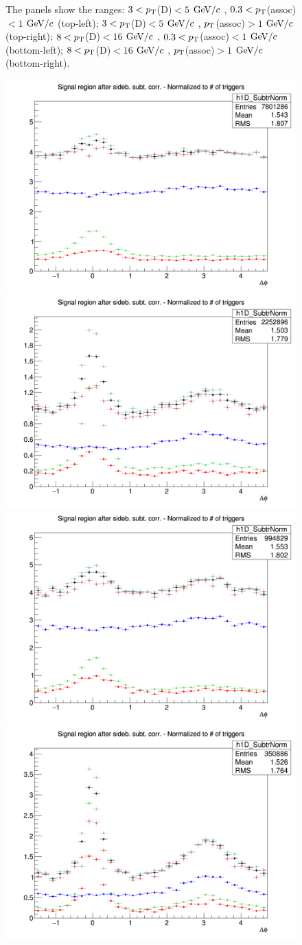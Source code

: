 \begin{figure}
{The panels show the ranges: $3 < p_{\rm T}$(D)$ < 5$ $\mathrm{GeV}/c$ , $0.3 < p_{\rm T}$(assoc)$ < 1$ $\mathrm{GeV}/c$  (top-left); $3 < p_{\rm T}$(D)$ < 5$ $\mathrm{GeV}/c$ , $p_{\rm T}$(assoc)$ > 1$ $\mathrm{GeV}/c$  (top-right); $8 < p_{\rm T}$(D)$ < 16$ $\mathrm{GeV}/c$ , $0.3 < p_{\rm T}$(assoc)$ < 1$ $\mathrm{GeV}/c$  (bottom-left); $8 < p_{\rm T}$(D)$ < 16$ $\mathrm{GeV}/c$ , $p_{\rm T}$(assoc)$ > 1$ $\mathrm{GeV}/c$  (bottom-right).}
\label{fig:MC_Kine}
\end{figure}

\begin{figure}
{\includegraphics[width=.48\linewidth]{figures/MC_closure/AzimCorrDistr_Dzero_Canvas_PtIntBins4to5_PoolInt_thr03to1_Superimposed_Reco.png}}
{\includegraphics[width=.48\linewidth]{figures/MC_closure/AzimCorrDistr_Dzero_Canvas_PtIntBins4to5_PoolInt_thr1to99_Superimposed_Reco.png}} \\
{\includegraphics[width=.48\linewidth]{figures/MC_closure/AzimCorrDistr_Dzero_Canvas_PtIntBins9to10_PoolInt_thr03to1_Superimposed_Reco.png}}
{\includegraphics[width=.48\linewidth]{figures/MC_closure/AzimCorrDistr_Dzero_Canvas_PtIntBins9to10_PoolInt_thr1to99_Superimposed_Reco.png}}

\end{figure}
